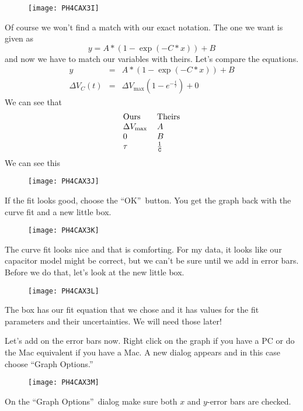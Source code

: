 \begin{figure}[h!]
\texttt{[image: PH4CAX3I]}
\end{figure}Of course we won't find a match
with our exact notation. The one we want is given as 
\begin{equation*}
y=A\ast (1-\exp (-C\ast x))+B
\end{equation*}%
and now we have to match our variables with theirs. Let's compare the
equations. 
\begin{eqnarray*}
y &=&A\ast (1-\exp (-C\ast x))+B \\
\Delta V_{C}\left( t\right) &=&\Delta V_{\max }\left( 1-e^{-\frac{t}{\tau }%
}\right) +0
\end{eqnarray*}%
We can see that 
\begin{equation*}
\begin{tabular}{ll}
Ours & Theirs \\ 
$\Delta V_{\max }$ & $A$ \\ 
$0$ & $B$ \\ 
$\tau $ & $\frac{1}{\mathtt{C}}$%
\end{tabular}%
\end{equation*}%
We can see this \begin{figure}[h!]
\texttt{[image: PH4CAX3J]}
\end{figure}

If the fit looks good, choose the \textquotedblleft OK\textquotedblright\
button. You get the graph back with the curve fit and a new little box. 
\begin{figure}[h!]
\texttt{[image: PH4CAX3K]}
\end{figure}The curve fit looks nice and that
is comforting. For my data, it looks like our capacitor model might be
correct, but we can't be sure until we add in error bars. Before we do that,
let's look at the new little box. \begin{figure}[h!]
\texttt{[image: PH4CAX3L]}
\end{figure}The box has our fit equation that
we chose and it has values for the fit parameters and their uncertainties.
We will need those later!

Let's add on the error bars now. Right click on the graph if you have a PC
or do the Mac equivalent if you have a Mac. A new dialog appears and in this
case choose \textquotedblleft Graph Options.\textquotedblright\ \begin{figure}[h!]
\texttt{[image: PH4CAX3M]}
\end{figure}%
On the \textquotedblleft Graph Options\textquotedblright\ dialog make sure
both $x$ and $y$-error bars are checked.

